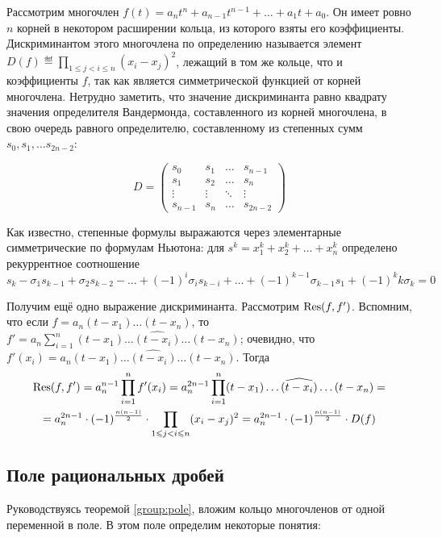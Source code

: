 Рассмотрим многочлен $f(t)=a_nt^n+a_{n-1}t^{n-1}+\dots+a_1t+a_0$. Он имеет ровно $n$ корней в некотором расширении кольца, из которого взяты его коэффициенты. Дискриминантом этого многочлена по определению называется элемент $D(f)\eqdef\prod\limits_{1\le j<i\le n}(x_i-x_j)^2$, лежащий в том же кольце, что и коэффициенты $f$, так как является симметрической функцией от корней многочлена. Нетрудно заметить, что значение дискриминанта равно квадрату значения определителя Вандермонда, составленного из корней многочлена, в свою очередь равного определителю, составленному из степенных сумм $s_0, s_1,\dots s_{2n-2}$:

$$
 D = 
 \left(
   \begin{matrix}
     s_0 & s_1 & \dots & s_{n-1}\\
     s_1 & s_2 & \dots & s_{n}  \\
     \vdots & \vdots & \ddots & \vdots\\
     s_{n-1} & s_{n} & \dots & s_{2n-2}
   \end{matrix}
 \right)
$$

Как известно, степенные формулы выражаются через элементарные симметрические по формулам Ньютона: для $s^k = x_1^k+x_2^k+\dots+x_n^k$ определено рекуррентное соотношение 
$$
 s_k - \sigma_1s_{k-1}+\sigma_2s_{k-2}-\dots+(-1)^i\sigma_is_{k-i}+\dots+(-1)^{k-1}\sigma_{k-1}s_1+(-1)^kk\sigma_k=0
$$

Получим ещё одно выражение дискриминанта. Рассмотрим $\operatorname{Res}(f,f')$. Вспомним, что если $f=a_n(t-x_1)\dots(t-x_n)$, то $f'=a_n\sum\limits_{i=1}^n(t-x_1)\dots\widehat{(t-x_i)}\dots(t-x_n)$; очевидно, что $f'(x_i)=a_n(t-x_1)\dots\widehat{(t-x_i)}\dots(t-x_n)$. Тогда
\begin{multline*}
  \operatorname{Res}(f,f')=a_n^{n-1}\prod_{i=1}^nf'(x_i)=a_n^{2n-1}\prod_{i=1}^n(t-x_1)\dots\widehat{(t-x_i)}\dots(t-x_n)=\\=a_n^{2n-1}\cdot(-1)^{\frac{n(n-1)}2}\cdot\prod_{1\leqslant j<i\leqslant n}(x_i-x_j)^2 = a^{2n-1}_n\cdot(-1)^{\frac{n(n-1)}2}\cdot D(f)
\end{multline*}

\subsection{Поле рациональных дробей}

Руководствуясь теоремой \ref{group:pole}, вложим кольцо многочленов от одной переменной в поле. В этом поле определим некоторые понятия:

